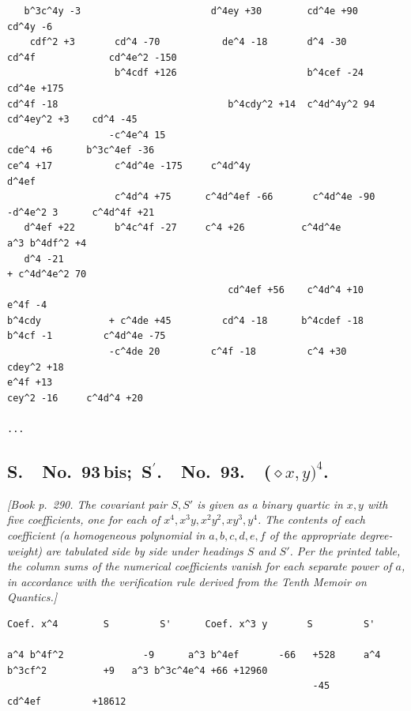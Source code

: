 \documentclass[11pt]{article}
\begin{document}
\begin{small}
\begin{verbatim}
   b^3c^4y -3                       d^4ey +30        cd^4e +90                cd^4y -6
    cdf^2 +3       cd^4 -70           de^4 -18       d^4 -30                  cd^4f             cd^4e^2 -150
                   b^4cdf +126                       b^4cef -24                                cd^4e +175
cd^4f -18                              b^4cdy^2 +14  c^4d^4y^2 94               cd^4ey^2 +3    cd^4 -45
                  -c^4e^4 15                                                    cde^4 +6      b^3c^4ef -36
ce^4 +17           c^4d^4e -175     c^4d^4y                                       d^4ef
                   c^4d^4 +75      c^4d^4ef -66       c^4d^4e -90              -d^4e^2 3      c^4d^4f +21
   d^4ef +22       b^4c^4f -27     c^4 +26          c^4d^4e                a^3 b^4df^2 +4
   d^4 -21                                                                                    + c^4d^4e^2 70
                                       cd^4ef +56    c^4d^4 +10               e^4f -4
b^4cdy            + c^4de +45         cd^4 -18      b^4cdef -18               b^4cf -1         c^4d^4e -75
                  -c^4de 20         c^4f -18         c^4 +30                    cdey^2 +18
e^4f +13                                                                        cey^2 -16     c^4d^4 +20
                                                                                              ...
\end{verbatim}
\end{small}

\bigskip

\subsection*{S.\ \ No.\ 93\,bis;\ S$^\prime$.\ \ No.\ 93.\ \ ($\diamond x,y)^4$.}

\textit{[Book p.~290. The covariant pair $S, S'$ is given as a binary quartic in $x,y$ with five coefficients, one for each of $x^4, x^3 y, x^2 y^2, x y^3, y^4$. The contents of each coefficient (a homogeneous polynomial in $a,b,c,d,e,f$ of the appropriate degree-weight) are tabulated side by side under headings $S$ and $S'$. Per the printed table, the column sums of the numerical coefficients vanish for each separate power of $a$, in accordance with the verification rule derived from the Tenth Memoir on Quantics.]}

\smallskip

\begin{small}
\begin{verbatim}
Coef. x^4        S         S'      Coef. x^3 y       S         S'

a^4 b^4f^2              -9      a^3 b^4ef       -66   +528     a^4 b^3cf^2          +9   a^3 b^3c^4e^4 +66 +12960
                                                      -45                                       cd^4ef         +18612
\end{verbatim}
\end{small}
\end{document}
